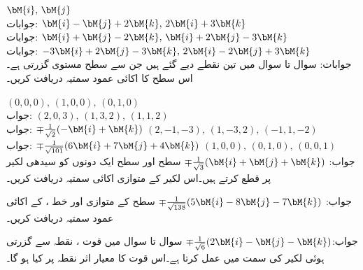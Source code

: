 \quad
$\bM{i},\,\bM{j}$\\
جوابات:
\quad
$\bM{i}-\bM{j}+2\bM{k},\, 2\bM{i}+3\bM{k}$\\
جوابات:
\quad
$\bM{i}+\bM{j}-2\bM{k},\,\bM{i}+2\bM{j}-3\bM{k}$\\
جوابات:
\quad
$-3\bM{i}+2\bM{j}-3\bM{k},\,2\bM{i}-2\bM{j}+3\bM{k}$\\
جوابات:
سوال  تا سوال  میں تین نقطے دیے گئے ہیں جن سے سطح مستوی گزرتی ہے۔اس سطح کا اکائی عمود سمتیہ دریافت کریں۔

\quad
$(0,0,0),\, (1,0,0),\, (0,1,0)$\\
جواب:
\quad
$(2,0,3),\, (1,3,2),\, (1,1,2)$\\
جواب:
$\mp\tfrac{1}{\sqrt{2}}(-\bM{i}+\bM{k})$
\quad
$(2,-1,-3),\, (1,-3,2),\, (-1,1,-2)$\\
جواب:
$\mp\tfrac{1}{\sqrt{101}}(6\bM{i}+7\bM{j}+4\bM{k})$
\quad
$(1,0,0),\, (0,1,0),\, (0,0,1)$\\
جواب:
$\mp\tfrac{1}{\sqrt{3}}(\bM{i}+\bM{j}+\bM{k})$
سطح  اور سطح  ایک دونوں کو سیدھی لکیر پر قطع کرتے ہیں۔اس لکیر کے متوازی اکائی سمتیہ دریافت کریں۔

جواب:
$\mp\tfrac{1}{\sqrt{138}}(5\bM{i}-8\bM{j}-7\bM{k})$
سطح  کے متوازی اور خط ،  کے اکائی عمود سمتیہ دریافت کریں۔

جواب:$\mp\tfrac{1}{\sqrt{6}}(2\bM{i}-\bM{j}-\bM{k})$
سوال  تا سوال  میں قوت ، نقطہ  سے گزرتی ہوئی لکیر کی سمت میں عمل کرتا ہے۔اس قوت کا معیار اثر   نقطہ  پر کیا ہو گا۔

